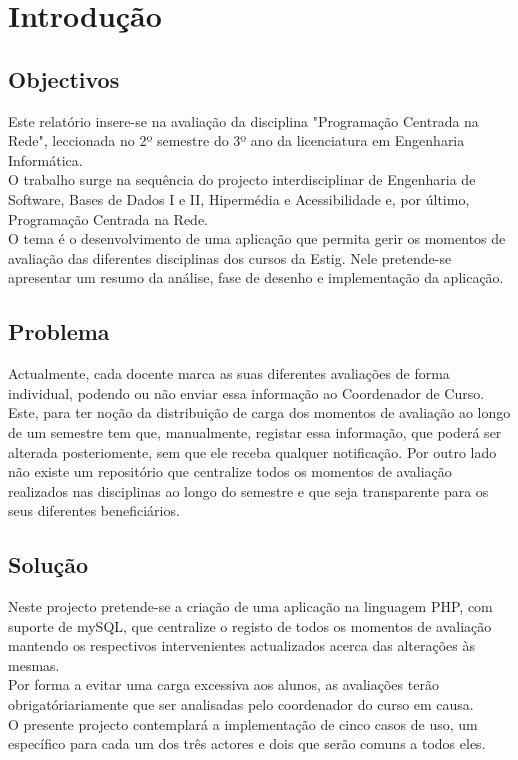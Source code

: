 

\chapter{Introdução}

\paragraph{}

\section{Objectivos}
Este relatório insere-se na avaliação da disciplina "Programação Centrada na Rede", leccionada no 2º semestre do 3º ano da licenciatura em Engenharia Informática.\\ 
O trabalho surge na sequência do projecto interdisciplinar de Engenharia de Software, Bases de Dados I e II, Hipermédia e Acessibilidade e, por último, Programação Centrada na Rede.\\
O tema é o desenvolvimento de uma aplicação que permita gerir os momentos de avaliação das diferentes disciplinas dos cursos da Estig.
Nele pretende-se apresentar um resumo da análise, fase de desenho e implementação da aplicação.\\

\section{Problema}
Actualmente, cada docente marca as suas diferentes avaliações de forma individual, podendo ou não enviar essa informação ao Coordenador de Curso. Este, para ter noção da distribuição de carga dos momentos de avaliação ao longo de um semestre tem que, manualmente, registar essa informação, que poderá ser alterada posteriomente, sem que ele receba qualquer notificação. Por outro lado não existe um repositório que centralize todos os momentos de avaliação realizados nas disciplinas ao longo do semestre e que seja transparente para os seus diferentes beneficiários.

\section{Solução}
Neste projecto pretende-se a criação de uma aplicação na linguagem PHP, com suporte de mySQL, que centralize o registo de todos os momentos de avaliação mantendo os respectivos intervenientes actualizados acerca das alterações às mesmas.\\
Por forma a evitar uma carga excessiva aos alunos, as avaliações terão obrigatóriariamente que ser analisadas pelo coordenador do curso em causa.\\
O presente projecto contemplará a implementação de cinco casos de uso, um específico para cada um dos três actores e dois que serão comuns a todos eles.\\

